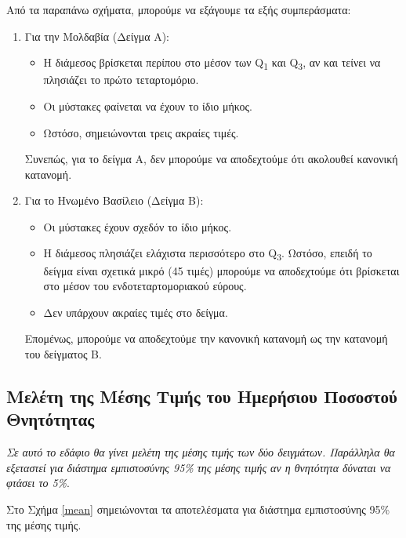 \documentclass{article}
\begin{document}
    Από τα παραπάνω σχήματα, μπορούμε να εξάγουμε τα εξής συμπεράσματα:
    \begin{enumerate}
              \item Για την Μολδαβία (Δείγμα Α):
                \begin{itemize}
                  \item Η διάμεσος βρίσκεται περίπου στο μέσον των \foreignlanguage{english}{Q\textsubscript{1}} και \foreignlanguage{english}{Q\textsubscript{3}}, αν και τείνει να πλησιάζει το πρώτο τεταρτομόριο.
                  \item Οι μύστακες φαίνεται να έχουν το ίδιο μήκος.
                  \item Ωστόσο, σημειώνονται τρεις ακραίες τιμές.
                \end{itemize}
                Συνεπώς, για το δείγμα Α, δεν μπορούμε να αποδεχτούμε ότι ακολουθεί κανονική κατανομή.
              \item Για το Ηνωμένο Βασίλειο (Δείγμα Β):
              \begin{itemize}
                  \item Οι μύστακες έχουν σχεδόν το ίδιο μήκος.
                  \item Η διάμεσος πλησιάζει ελάχιστα περισσότερο στο \foreignlanguage{english}{Q\textsubscript{3}}. Ωστόσο, επειδή το δείγμα είναι σχετικά μικρό (45 τιμές) μπορούμε να αποδεχτούμε ότι βρίσκεται στο μέσον του ενδοτεταρτομοριακού εύρους.
                  \item Δεν υπάρχουν ακραίες τιμές στο δείγμα.
              \end{itemize}
                  Επομένως, μπορούμε να αποδεχτούμε την κανονική κατανομή ως την κατανομή του δείγματος Β.
            \end{enumerate}
    
    \subsection{Μελέτη της Μέσης Τιμής του Ημερήσιου Ποσοστού Θνητότητας}
    
    \emph{Σε αυτό το εδάφιο θα γίνει μελέτη της μέσης τιμής των δύο δειγμάτων. Παράλληλα θα εξεταστεί για διάστημα εμπιστοσύνης 95\% της μέσης τιμής αν η θνητότητα δύναται να φτάσει το 5\%}.
    
    Στο Σχήμα \autoref{mean} σημειώνονται τα αποτελέσματα για διάστημα εμπιστοσύνης 95\% της μέσης τιμής. 
    
\end{document}
